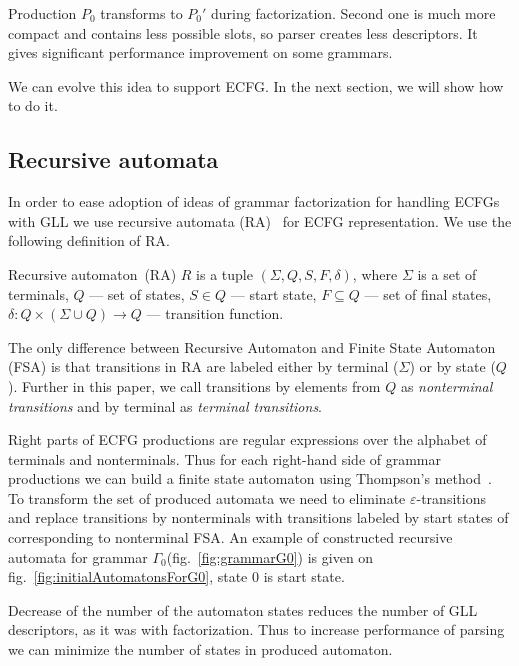 \documentclass[runningheads,a4paper]{llncs}
\begin{document}
Production $P_0$ transforms to $P_0'$ during factorization.
Second one is much more compact and contains less possible slots, so parser creates less descriptors.
It gives significant performance improvement on some grammars.

We can evolve this idea to support ECFG.
In the next section, we will show how to do it.

\subsection{Recursive automata}

In order to ease adoption of ideas of grammar factorization for handling ECFGs with GLL we use recursive automata (RA)~\cite{tellier2006learning} for ECFG representation.
We use the following definition of RA.

\begin{mydef}
    Recursive automaton~(RA) $R$ is a tuple $(\Sigma, Q, S, F, \delta)$, where
    $\Sigma$ is a set of terminals,
    $Q$ --- set of states,
    $S \in Q$ --- start state,
    $F \subseteq Q$ --- set of final states,
    $\delta : Q \times (\Sigma \cup Q) \to Q$ --- transition function.
\end{mydef}

The only difference between Recursive Automaton and Finite State Automaton (FSA) is that transitions in RA are labeled either by terminal ($\Sigma$) or by state ($Q$).
Further in this paper, we call transitions by elements from $Q$ as \textit{nonterminal transitions} and by terminal as \textit{terminal transitions}.

Right parts of ECFG productions are regular expressions over the alphabet of terminals and nonterminals.
Thus for each right-hand side of grammar productions we can build a finite state automaton 
using Thompson's method~\cite{Thompson:1968:PTR:363347.363387}. 
To transform the set of produced automata we need to eliminate $\varepsilon$-transitions and replace
transitions by nonterminals with transitions labeled by start states of corresponding to nonterminal FSA.
An example of constructed recursive automata for grammar $\Gamma_{0}$(fig.~\ref{fig:grammarG0})
is given on fig.~\ref{fig:initialAutomatonsForG0}, state 0 is start state.

Decrease of the number of the automaton states reduces the number of GLL descriptors, as it was with factorization.
Thus to increase performance of parsing we can minimize the number of states in produced automaton.
\end{document}
